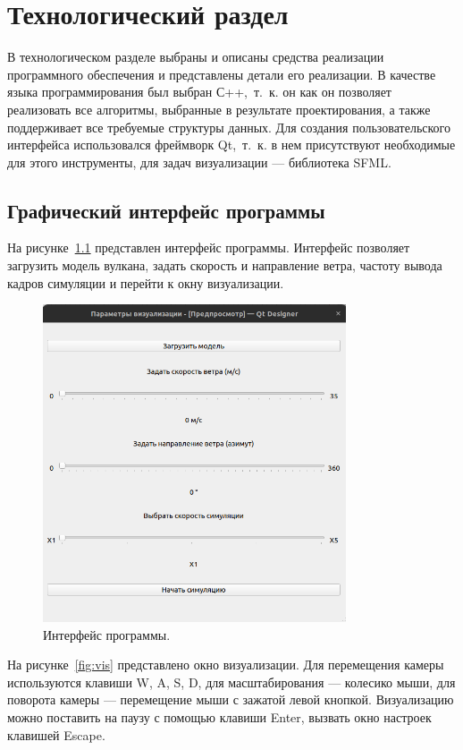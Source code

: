 \chapter{Технологический раздел}

В технологическом разделе выбраны и описаны средства реализации программного обеспечения и представлены детали его реализации.
В качестве языка программирования был выбран С++,~т.~к. он 
как он позволяет реализовать все алгоритмы, выбранные в результате проектирования, а также поддерживает все требуемые структуры данных. Для создания пользовательского интерфейса использовался фреймворк Qt,~т.~к. в нем присутствуют необходимые для этого инструменты, для задач визуализации --- библиотека SFML.

\section{Графический интерфейс программы}
На рисунке~\ref{fig:interface} представлен интерфейс программы. Интерфейс позволяет загрузить модель вулкана, задать скорость и направление ветра, частоту вывода кадров симуляции и перейти к окну визуализации. 

\begin{figure}[H]
	\centering
	\includegraphics[width=0.8\textwidth, page=1]{assets/img/interface.png}   
	\caption{Интерфейс программы.}
	\label{fig:interface}
\end{figure}

На рисунке~\ref{fig:vis} представлено окно визуализации. Для перемещения камеры используются клавиши W, A, S, D, для масштабирования --- колесико мыши, для поворота камеры --- перемещение мыши с зажатой левой кнопкой. Визуализацию можно поставить на паузу с помощью клавиши Enter, вызвать окно настроек клавишей Escape.

